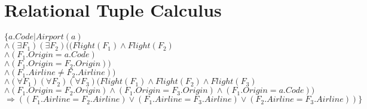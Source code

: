 \documentclass[a4paper,11pt,twoside]{article}
\begin{document}
\section{Relational Tuple Calculus}
$\{a.Code|Airport (a)$\\
$\land (\exists F_1)(\exists F_2)((Flight(F_1) \land Flight(F_2)$\\
$ \land (F_1.Origin = a.Code)$\\
$ \land (F_1.Origin = F_2.Origin))$\\
$ \land (F_1.Airline \neq F_2.Airline))$\\ 
$ \land  (\forall F_1)(\forall F_2)(\forall F_3)(Flight(F_1) \land Flight(F_2) \land Flight(F_3)$\\
$ \land (F_1.Origin = F_2.Origin) \land (F_1.Origin = F_3.Origin) \land (F_1.Origin = a.Code))$\\
$ \Rightarrow ((F_1.Airline = F_2.Airline) \lor (F_1.Airline = F_3.Airline) \lor (F_2.Airline = F_3.Airline))\}$\\


\end{document}
